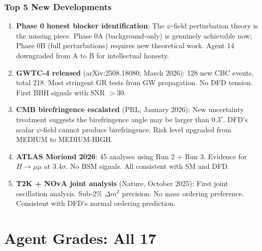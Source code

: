 \documentclass[11pt,a4paper]{article}
\begin{document}
\section{Top 5 New Developments}

\begin{enumerate}
\item \textbf{Phase 0 honest blocker identification}: The $\psi$-field perturbation theory is the missing piece. Phase 0A (background-only) is genuinely achievable now; Phase 0B (full perturbations) requires new theoretical work. Agent 14 downgraded from A to B for intellectual honesty.

\item \textbf{GWTC-4 released} (arXiv:2508.18080; March 2026): 128 new CBC events, total 218. Most stringent GR tests from GW propagation. No DFD tension. First BBH signals with SNR $> 30$.

\item \textbf{CMB birefringence escalated} (PRL, January 2026): New uncertainty treatment suggests the birefringence angle may be larger than $0.3^\circ$. DFD's scalar $\psi$-field cannot produce birefringence. Risk level upgraded from MEDIUM to MEDIUM-HIGH.

\item \textbf{ATLAS Moriond 2026}: 45 analyses using Run 2 + Run 3. Evidence for $H \to \mu\mu$ at $3.4\sigma$. No BSM signals. All consistent with SM and DFD.

\item \textbf{T2K + NOvA joint analysis} (Nature, October 2025): First joint oscillation analysis. Sub-2\% $\Delta m^2$ precision. No mass ordering preference. Consistent with DFD's normal ordering prediction.
\end{enumerate}


\part{Agent Grades: All 17}
\end{document}
